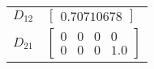 \begin{tabular}{cl}
 $D_{12}$ & $\left[\begin{matrix}0.70710678\end{matrix}\right]$                                                                                                                                                                                                                                                                                                                                                                                                                                                                                               \\
 $D_{21}$ & $\left[\begin{matrix}0 & 0 & 0 & 0\\0 & 0 & 0 & 1.0\end{matrix}\right]$                                                                                                                                                                                                                                                                                                                                                                                                                                                                           \\
\hline
\end{tabular}